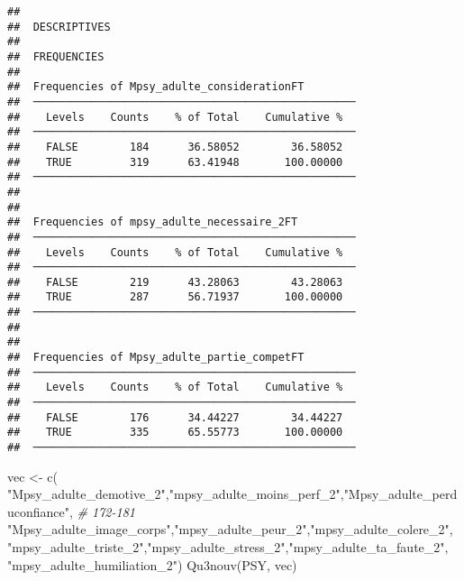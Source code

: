 \documentclass[
]{article}
\newenvironment{Shaded}{\begin{snugshade}}{\end{snugshade}}
\newcommand{\CommentTok}[1]{\textcolor[rgb]{0.56,0.35,0.01}{\textit{#1}}}
\newcommand{\FunctionTok}[1]{\textcolor[rgb]{0.00,0.00,0.00}{#1}}
\newcommand{\NormalTok}[1]{#1}
\newcommand{\OtherTok}[1]{\textcolor[rgb]{0.56,0.35,0.01}{#1}}
\newcommand{\StringTok}[1]{\textcolor[rgb]{0.31,0.60,0.02}{#1}}
\begin{document}
\begin{verbatim}
## 
##  DESCRIPTIVES
## 
##  FREQUENCIES
## 
##  Frequencies of Mpsy_adulte_considerationFT         
##  ────────────────────────────────────────────────── 
##    Levels    Counts    % of Total    Cumulative %   
##  ────────────────────────────────────────────────── 
##    FALSE        184      36.58052        36.58052   
##    TRUE         319      63.41948       100.00000   
##  ────────────────────────────────────────────────── 
## 
## 
##  Frequencies of mpsy_adulte_necessaire_2FT          
##  ────────────────────────────────────────────────── 
##    Levels    Counts    % of Total    Cumulative %   
##  ────────────────────────────────────────────────── 
##    FALSE        219      43.28063        43.28063   
##    TRUE         287      56.71937       100.00000   
##  ────────────────────────────────────────────────── 
## 
## 
##  Frequencies of Mpsy_adulte_partie_competFT         
##  ────────────────────────────────────────────────── 
##    Levels    Counts    % of Total    Cumulative %   
##  ────────────────────────────────────────────────── 
##    FALSE        176      34.44227        34.44227   
##    TRUE         335      65.55773       100.00000   
##  ──────────────────────────────────────────────────
\end{verbatim}

\begin{Shaded}
\begin{Highlighting}[]
\NormalTok{vec }\OtherTok{\textless{}{-}} \FunctionTok{c}\NormalTok{( }\StringTok{"Mpsy\_adulte\_demotive\_2"}\NormalTok{,}\StringTok{"mpsy\_adulte\_moins\_perf\_2"}\NormalTok{,}\StringTok{"Mpsy\_adulte\_perduconfiance"}\NormalTok{,   }\CommentTok{\# 172{-}181}
     \StringTok{"Mpsy\_adulte\_image\_corps"}\NormalTok{,}\StringTok{"mpsy\_adulte\_peur\_2"}\NormalTok{,}\StringTok{"mpsy\_adulte\_colere\_2"}\NormalTok{,}
     \StringTok{"mpsy\_adulte\_triste\_2"}\NormalTok{,}\StringTok{"mpsy\_adulte\_stress\_2"}\NormalTok{,}\StringTok{"mpsy\_adulte\_ta\_faute\_2"}\NormalTok{,}
     \StringTok{"mpsy\_adulte\_humiliation\_2"}\NormalTok{)}
\FunctionTok{Qu3nouv}\NormalTok{(PSY, vec)}
\end{Highlighting}
\end{Shaded}
\end{document}
